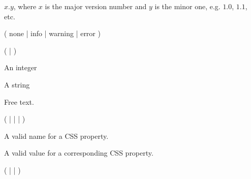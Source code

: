 \bigskip
\noindent
{}

$x.y$, where $x$ is the major version number and $y$ is the minor one,
e.g. $1.0$, $1.1$, etc.

\bigskip
\noindent
{}

( none | info | warning | error )

\bigskip
\noindent
{}

(  |  )

\bigskip
\noindent
{}

An integer

\bigskip
\noindent
{}

A string

\bigskip
\noindent
{}

Free text.

\bigskip
\noindent
{}

(  |  |  | )

\bigskip
\noindent
{}

A valid name for a CSS property.

\bigskip
\noindent
{}

A valid value for a corresponding CSS property.

\bigskip
\noindent
{}

 (  |  |  )

